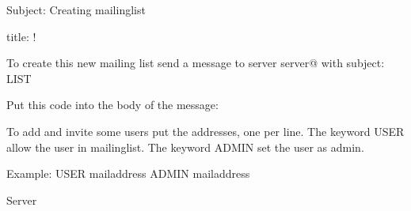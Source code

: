 Subject: Creating mailinglist %

title: !

To create this new mailing list send a message to server server@%
with subject:
LIST %

Put this code into the body of the message:

To add and invite some users put the addresses, one per line.
The keyword USER allow the user in mailinglist.
The keyword ADMIN set the user as admin.

Example:
USER mailaddress
ADMIN mailaddress

Server %